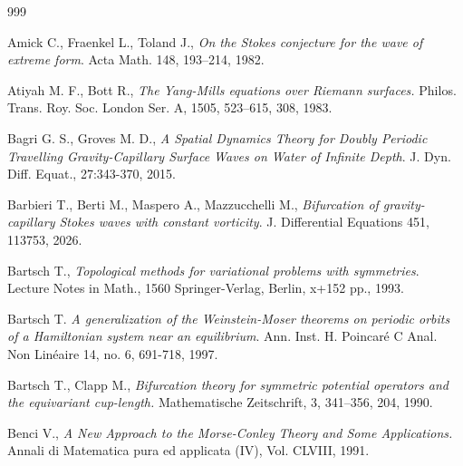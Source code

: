 \documentclass[11pt,a4paper,reqno]{article}
\numberwithin{equation}{section}
\theoremstyle{definition}
\begin{document}
  \begin{footnotesize}

\begin{thebibliography}{999}                                         


    Amick C.,  Fraenkel L.,  Toland J., {\it On the Stokes conjecture for the wave of extreme form}. Acta Math. 148, 193–214, 1982.




Atiyah M. F.,  Bott R.,
{\it The {Y}ang-{M}ills equations over {R}iemann surfaces.} 
Philos. Trans. Roy. Soc. London Ser. A, 
1505, 523--615, 308, 1983.

Bagri G. S.,  Groves M. D., 
{\it A Spatial Dynamics Theory for Doubly Periodic
Travelling Gravity-Capillary Surface Waves on Water
of Infinite Depth}. 
J. Dyn. Diff. Equat., 27:343-370, 2015. 

Barbieri T., Berti M., Maspero A., Mazzucchelli M.,
{\it Bifurcation of gravity-capillary Stokes waves with constant vorticity}.
J. Differential Equations 451, 113753, 2026.






 Bartsch T., {\it Topological methods for variational problems with symmetries}.
Lecture Notes in Math., 1560
Springer-Verlag, Berlin, x+152 pp.,
1993.

Bartsch T.
{\it A generalization of the Weinstein-Moser theorems on periodic orbits of a Hamiltonian system near an equilibrium}. 
Ann. Inst. H. Poincar\'e C 
Anal. Non Lin\'eaire 14, no. 6, 691-718, 1997.


Bartsch T., Clapp M.,
{\it Bifurcation theory for symmetric potential operators and the equivariant cup-length.}  
Mathematische Zeitschrift,
3, 341--356, 204, 1990.

 Benci V., {\it A New Approach to the Morse-Conley Theory
and Some Applications.} Annali di Matematica pura ed applicata
(IV), Vol. CLVIII, 1991.


\end{thebibliography}
\end{footnotesize}
\end{document}
